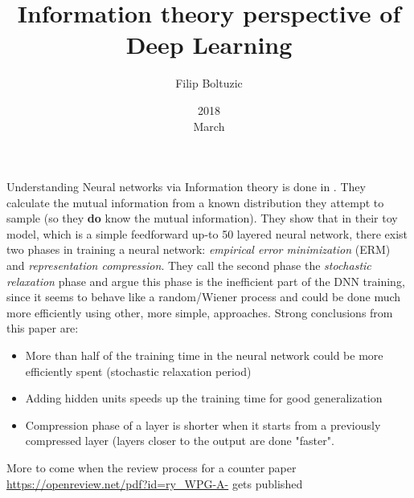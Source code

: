 \documentclass[a4paper,10pt]{article}
\title{Information theory perspective of Deep Learning}
\author{Filip Boltuzic}
\date{2018 \\ March}
\begin{document}
\maketitle

Understanding Neural networks via Information theory is done in
\cite{Schwartz-Ziv2017}. They calculate the mutual information from
a known distribution they attempt to sample (so they \textbf{do} know the
mutual information). They show that in their toy model, which is a simple
feedforward up-to 50 layered neural network, there exist two phases in
training a neural network: \emph{empirical error minimization} (ERM) and
\emph{representation compression}. They call the second phase the
\emph{stochastic relaxation} phase and argue this phase is the inefficient
part of the DNN training, since it seems to behave like a random/Wiener
process and could be done much more efficiently using other, more simple,
approaches. Strong conclusions from this paper are:

\begin{itemize} 
\item More than half of the training time in the neural
network could be more efficiently spent (stochastic relaxation period)

\item Adding hidden units speeds up the training time for good
generalization

\item Compression phase of a layer is shorter when it starts from
a previously compressed layer (layers closer to the output are done
"faster". 


\end{itemize}

\noindent More to come when the review process for a counter paper 
\url{https://openreview.net/pdf?id=ry_WPG-A-}
gets published

 

\end{document}
